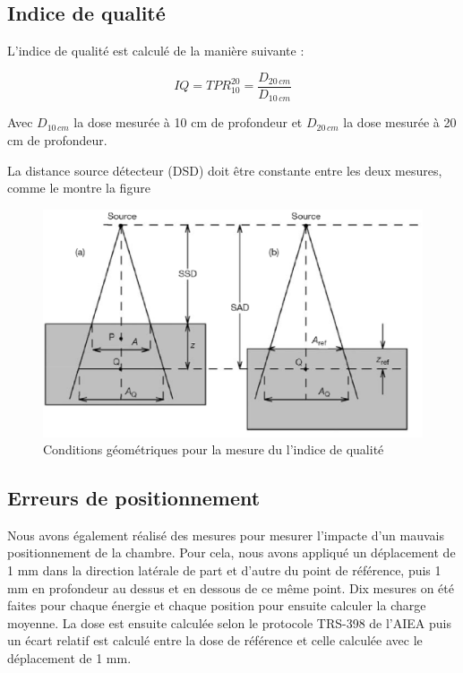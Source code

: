 \documentclass{article}
\begin{document}
\subsection{Indice de qualité}

L'indice de qualité est calculé de la manière suivante :

\begin{equation}
  IQ = TPR^{20}_{10} = \dfrac{D_{20 \, cm}}{D_{10 \, cm}}
  \label{eq_iq}
\end{equation}

Avec $D_{10 \, cm}$ la dose mesurée à 10 cm de profondeur et $D_{20 \, cm}$ la dose mesurée à 20 cm de profondeur.

La distance source détecteur (DSD) doit être constante entre les deux mesures, comme le montre la figure 

\begin{figure}[h]
  \centering
  \includegraphics[scale=0.5]{figures/rtf.png}
  \caption{Conditions géométriques pour la mesure du l'indice de qualité}
  \label{fig_tpr}
\end{figure}

\subsection{Erreurs de positionnement}

Nous avons également réalisé des mesures pour mesurer l'impacte d'un mauvais positionnement de la chambre. Pour cela, nous avons appliqué un déplacement de 1 mm dans la direction latérale de part et d'autre du point de référence, puis 1 mm en profondeur au dessus et en dessous de ce même point. Dix mesures on été faites pour chaque énergie et chaque position pour ensuite calculer la charge moyenne. La dose est ensuite calculée selon le protocole TRS-398 de l'AIEA \cite{international2001iaea} puis un écart relatif est calculé entre la dose de référence et celle calculée avec le déplacement de 1 mm.
\end{document}
